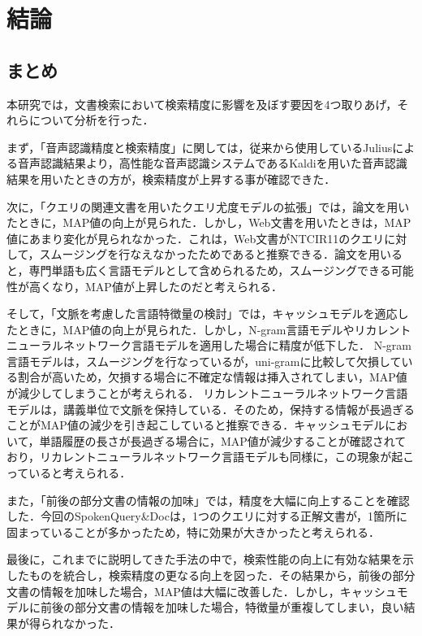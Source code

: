 
\chapter{結論} 
\section{まとめ}
本研究では，文書検索において検索精度に影響を及ぼす要因を4つ取りあげ，それらについて分析を行った．

まず，「音声認識精度と検索精度」に関しては，従来から使用しているJuliusによる音声認識結果より，高性能な音声認識システムであるKaldiを用いた音声認識結果を用いたときの方が，検索精度が上昇する事が確認できた．

次に，「クエリの関連文書を用いたクエリ尤度モデルの拡張」では，論文を用いたときに，MAP値の向上が見られた．しかし，Web文書を用いたときは，MAP値にあまり変化が見られなかった．これは，Web文書がNTCIR11のクエリに対して，スムージングを行なえなかったためであると推察できる．論文を用いると，専門単語も広く言語モデルとして含められるため，スムージングできる可能性が高くなり，MAP値が上昇したのだと考えられる．

そして，「文脈を考慮した言語特徴量の検討」では，キャッシュモデルを適応したときに，MAP値の向上が見られた．しかし，N-gram言語モデルやリカレントニューラルネットワーク言語モデルを適用した場合に精度が低下した．
N-gram言語モデルは，スムージングを行なっているが，uni-gramに比較して欠損している割合が高いため，欠損する場合に不確定な情報は挿入されてしまい，MAP値が減少してしまうことが考えられる．
リカレントニューラルネットワーク言語モデルは，講義単位で文脈を保持している．そのため，保持する情報が長過ぎることがMAP値の減少を引き起こしていると推察できる．キャッシュモデルにおいて，単語履歴の長さが長過ぎる場合に，MAP値が減少することが確認されており，リカレントニューラルネットワーク言語モデルも同様に，この現象が起こっていると考えられる．

また，「前後の部分文書の情報の加味」では，精度を大幅に向上することを確認した．今回のSpokenQuery\&Docは，1つのクエリに対する正解文書が，1箇所に固まっていることが多かったため，特に効果が大きかったと考えられる．

最後に，これまでに説明してきた手法の中で，検索性能の向上に有効な結果を示したものを統合し，検索精度の更なる向上を図った．その結果から，前後の部分文書の情報を加味した場合，MAP値は大幅に改善した．しかし，キャッシュモデルに前後の部分文書の情報を加味した場合，特徴量が重複してしまい，良い結果が得られなかった．

